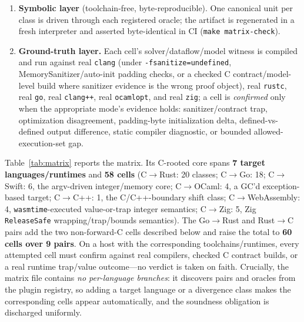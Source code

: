 \documentclass[10pt,a4paper]{article}
\begin{document}
\begin{enumerate}[nosep]
  \item \textbf{Symbolic layer} (toolchain-free, byte-reproducible). One
    canonical unit per class is driven through each registered oracle; the
    artifact is regenerated in a fresh interpreter and asserted byte-identical
    in CI (\texttt{make matrix-check}).
  \item \textbf{Ground-truth layer.} Each cell's solver/dataflow/model witness is compiled and run
    against real \texttt{clang} (under \texttt{-fsanitize=undefined},
    MemorySanitizer/auto-init padding checks, or a checked C
    contract/model-level build where sanitizer evidence is the wrong
    proof object), real \texttt{rustc}, real \texttt{go}, real \texttt{clang++},
    real \texttt{ocamlopt}, and real \texttt{zig}; a cell is \emph{confirmed} only when the
    appropriate mode's evidence holds: sanitizer/contract trap, optimization
    disagreement, padding-byte initialization delta, defined-vs-defined output
    difference, static compiler diagnostic, or bounded allowed-execution-set gap.
\end{enumerate}

Table~\ref{tab:matrix} reports the matrix. Its C-rooted core spans \textbf{7
target languages/runtimes} and \textbf{58 cells} (C$\to$Rust: 20 classes;
C$\to$Go: 18; C$\to$Swift: 6, the argv-driven integer/memory core; C$\to$OCaml:
4, a GC'd exception-based target; C$\to$C++: 1, the C/C++-boundary shift class;
C$\to$WebAssembly: 4, \texttt{wasmtime}-executed value-or-trap integer
semantics; C$\to$Zig: 5, Zig \texttt{ReleaseSafe} wrapping/trap/bounds
semantics). The Go$\to$Rust and Rust$\to$C pairs add the two non-forward-C cells
described below and raise the total to \textbf{60 cells over 9 pairs}. On a host
with the corresponding toolchains/runtimes, every attempted cell must confirm
against real compilers, checked C contract builds, or a real runtime trap/value
outcome---no verdict is taken on
faith. Crucially, the matrix file contains \emph{no per-language branches}: it
discovers pairs and oracles from the plugin registry, so adding a target
language or a divergence class makes the corresponding cells appear
automatically, and the soundness obligation is discharged uniformly.
\end{document}
